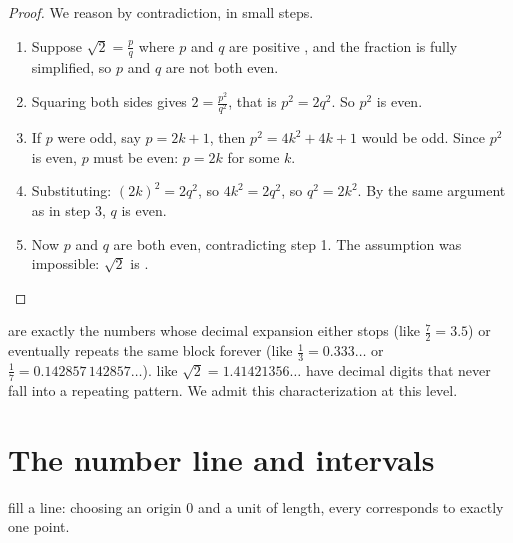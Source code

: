 \begin{proof}
We reason by contradiction, in small steps.
\begin{enumerate}
  \item Suppose $\sqrt 2 = \frac{p}{q}$ where $p$ and $q$ are positive
        , and the fraction is fully simplified, so $p$ and $q$ are
        not both even.
  \item Squaring both sides gives $2 = \frac{p^2}{q^2}$, that is
        $p^2 = 2q^2$. So $p^2$ is even.
  \item If $p$ were odd, say $p = 2k+1$, then
        $p^2 = 4k^2 + 4k + 1$ would be odd. Since $p^2$ is even, $p$ must
        be even: $p = 2k$ for some  $k$.
  \item Substituting: $(2k)^2 = 2q^2$, so $4k^2 = 2q^2$, so
        $q^2 = 2k^2$. By the same argument as in step 3, $q$ is even.
  \item Now $p$ and $q$ are both even, contradicting step 1. The
        assumption was impossible: $\sqrt 2$ is .
\end{enumerate}
\end{proof}

\begin{remark}
 are exactly the numbers whose decimal expansion either
stops (like $\frac72 = 3.5$) or eventually repeats the same block forever
(like $\frac13 = 0.333\dots$ or $\frac{1}{7} = 0.142857\,142857\dots$).
 like $\sqrt2 = 1.41421356\dots$ have decimal digits
that never fall into a repeating pattern. We admit this characterization
at this level.
\end{remark}

\section{The number line and intervals}

 fill a line: choosing an origin $0$ and a unit of length,
every  corresponds to exactly one point.

